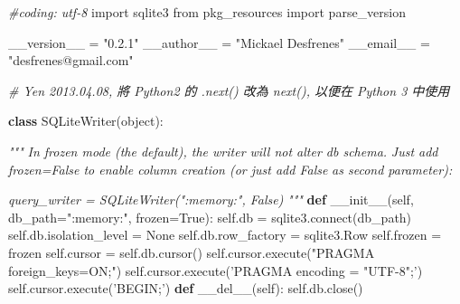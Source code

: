 \documentclass[]{article}
\newenvironment{Shaded}{}{}
\newcommand{\KeywordTok}[1]{\textcolor[rgb]{0.00,0.44,0.13}{\textbf{{#1}}}}
\newcommand{\DataTypeTok}[1]{\textcolor[rgb]{0.56,0.13,0.00}{{#1}}}
\newcommand{\CharTok}[1]{\textcolor[rgb]{0.25,0.44,0.63}{{#1}}}
\newcommand{\StringTok}[1]{\textcolor[rgb]{0.25,0.44,0.63}{{#1}}}
\newcommand{\CommentTok}[1]{\textcolor[rgb]{0.38,0.63,0.69}{\textit{{#1}}}}
\newcommand{\OtherTok}[1]{\textcolor[rgb]{0.00,0.44,0.13}{{#1}}}
\newcommand{\NormalTok}[1]{{#1}}
\begin{document}
\begin{Shaded}
\begin{Highlighting}[]
\CommentTok{#coding: utf-8}
\CharTok{import} \NormalTok{sqlite3}
\CharTok{from} \NormalTok{pkg_resources }\CharTok{import} \NormalTok{parse_version}

\NormalTok{__version__ = }\StringTok{"0.2.1"}
\NormalTok{__author__ = }\StringTok{"Mickael Desfrenes"}
\NormalTok{__email__ = }\StringTok{"desfrenes@gmail.com"}

\CommentTok{# Yen 2013.04.08, 將 Python2 的 .next() 改為 next(), 以便在 Python 3 中使用}

\KeywordTok{class} \NormalTok{SQLiteWriter(}\DataTypeTok{object}\NormalTok{):}

    \CommentTok{"""}
\CommentTok{    In frozen mode (the default), the writer will not alter db schema.}
\CommentTok{    Just add frozen=False to enable column creation (or just add False}
\CommentTok{    as second parameter):}

\CommentTok{    query_writer = SQLiteWriter(":memory:", False)}
\CommentTok{    """}
    \KeywordTok{def} \OtherTok{__init__}\NormalTok{(}\OtherTok{self}\NormalTok{, db_path=}\StringTok{":memory:"}\NormalTok{, frozen=}\OtherTok{True}\NormalTok{):}
        \OtherTok{self}\NormalTok{.db = sqlite3.}\OtherTok{connect}\NormalTok{(db_path)}
        \OtherTok{self}\NormalTok{.db.isolation_level = }\OtherTok{None}
        \OtherTok{self}\NormalTok{.db.row_factory = sqlite3.Row}
        \OtherTok{self}\NormalTok{.frozen = frozen}
        \OtherTok{self}\NormalTok{.cursor = }\OtherTok{self}\NormalTok{.db.cursor()}
        \OtherTok{self}\NormalTok{.cursor.execute(}\StringTok{"PRAGMA foreign_keys=ON;"}\NormalTok{)}
        \OtherTok{self}\NormalTok{.cursor.execute(}\StringTok{'PRAGMA encoding = "UTF-8";'}\NormalTok{)}
        \OtherTok{self}\NormalTok{.cursor.execute(}\StringTok{'BEGIN;'}\NormalTok{)}
    \KeywordTok{def} \OtherTok{__del__}\NormalTok{(}\OtherTok{self}\NormalTok{):}
        \OtherTok{self}\NormalTok{.db.close()}


\end{Highlighting}
\end{Shaded}
\end{document}
